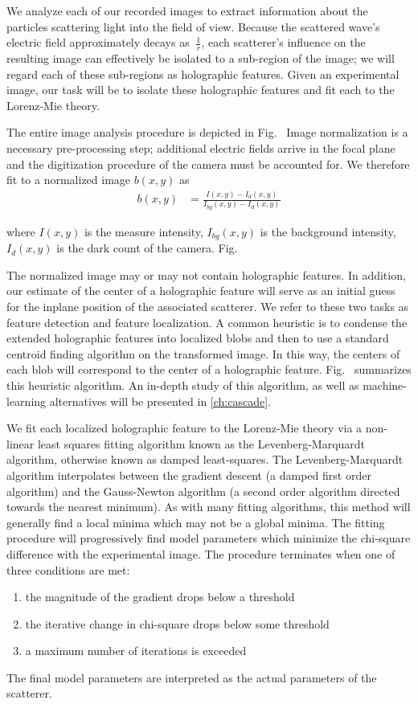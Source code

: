 We analyze each of our recorded images to extract information about the particles
scattering light into the field of view.  Because the scattered wave's electric
field approximately decays as $~\frac{1}{r}$, each scatterer's influence on the
resulting image can effectively be isolated to a sub-region of the image; we will
regard each of these sub-regions as holographic features.  Given an experimental
image, our task will be to isolate these holographic features and fit each
to the Lorenz-Mie theory.

The entire image analysis procedure is depicted in Fig.~%
Image normalization is a necessary pre-processing step; additional
electric fields arrive in the focal plane and the digitization procedure
of the camera must be accounted for. We therefore fit to a normalized
image $b(x,y)$ as
\begin{align}
  b(x,y) &= \frac{ I(x,y) - I_d(x,y)}{ I_{bg}(x,y) - I_d(x,y)} 
\end{align}

where $I(x,y)$ is the measure intensity,
$I_{bg}(x,y)$ is the background intensity,
$I_d(x,y)$ is the dark count of the camera.
Fig.~%

The normalized image may or may not contain holographic features. In addition,
our estimate of the center of a holographic feature will serve as an initial guess
for the inplane position of the associated scatterer. We refer to these two tasks as
feature detection and feature localization. A common heuristic is to condense the
extended holographic features into localized blobs and then to use a standard
centroid finding algorithm on the transformed image. In this way, the centers
of each blob will correspond to the center of a holographic feature. Fig.~%
summarizes this heuristic algorithm. An in-depth study of this algorithm, as well
as machine-learning alternatives will be presented in \autoref{ch:cascade}.

We fit each localized holographic feature to the Lorenz-Mie theory
via a non-linear least squares fitting algorithm known as the Levenberg-Marquardt
algorithm, otherwise known as damped least-squares. The Levenberg-Marquardt
algorithm interpolates between the gradient descent (a damped first order algorithm)
and the Gauss-Newton algorithm (a second order algorithm directed towards the nearest
minimum). As with many fitting algorithms, this method will generally find a local
minima which may not be a global minima. The fitting procedure will
progressively find model parameters which minimize the chi-square difference
with the experimental image. The procedure terminates when one of three
conditions are met:
\begin{enumerate}
\item the magnitude of the gradient drops below a threshold
\item the iterative change in chi-square drops below some threshold
\item a maximum number of iterations is exceeded
\end{enumerate}
The final model parameters are interpreted as the actual parameters of the
scatterer.

